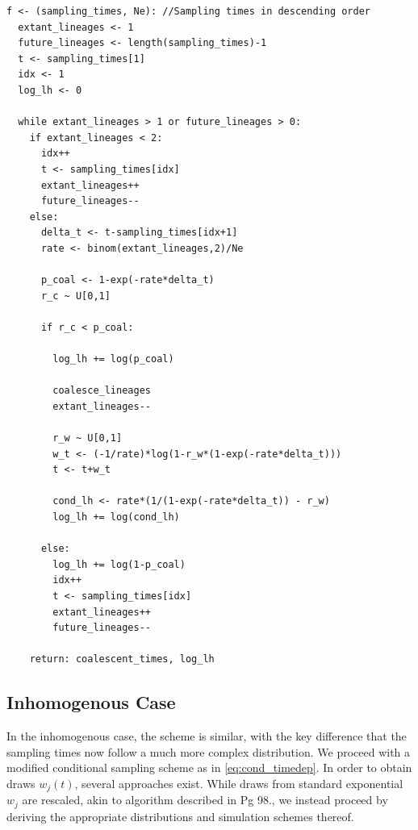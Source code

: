 \documentclass{report}
\theoremstyle{definition}
\begin{document}
\begin{lstlisting}
f <- (sampling_times, Ne): //Sampling times in descending order
  extant_lineages <- 1
  future_lineages <- length(sampling_times)-1
  t <- sampling_times[1]
  idx <- 1
  log_lh <- 0

  while extant_lineages > 1 or future_lineages > 0:
    if extant_lineages < 2:
      idx++
      t <- sampling_times[idx]
      extant_lineages++
      future_lineages--
    else:
      delta_t <- t-sampling_times[idx+1]
      rate <- binom(extant_lineages,2)/Ne

      p_coal <- 1-exp(-rate*delta_t)
      r_c ~ U[0,1] 

      if r_c < p_coal:

        log_lh += log(p_coal)

        coalesce_lineages
        extant_lineages--

        r_w ~ U[0,1]
        w_t <- (-1/rate)*log(1-r_w*(1-exp(-rate*delta_t)))
        t <- t+w_t

        cond_lh <- rate*(1/(1-exp(-rate*delta_t)) - r_w)
        log_lh += log(cond_lh)

      else:
        log_lh += log(1-p_coal)
        idx++
        t <- sampling_times[idx]
        extant_lineages++
        future_lineages--

    return: coalescent_times, log_lh
\end{lstlisting}
\subsection{Inhomogenous Case}
In the inhomogenous case, the scheme is similar, with the key difference that the sampling times now follow a much more complex distribution. We proceed with a modified conditional sampling scheme as in \ref{eq:cond_timedep}. In order to obtain draws $w_j(t)$, several approaches exist. While draws from standard exponential $w_j$ are rescaled, akin to algorithm described in \cite{hein_gene_2004} Pg 98., we instead proceed by deriving the appropriate distributions and simulation schemes thereof.
\end{document}

